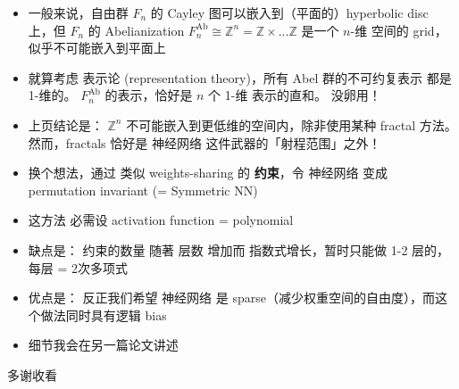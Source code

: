 \documentclass[15pt]{beamer}
\newcommand{\red}[1]{{\color{red}#1}}
\begin{document}
\begin{frame}
\begin{itemize}
\begin{equation}
		\end{equation}
	\item 一般来说，自由群 $F_n$ 的 Cayley 图可以嵌入到（平面的）hyperbolic disc 上，但 $F_n$ 的 Abelianization $F_n^{\text{Ab}} \cong \mathbb{Z}^n = \mathbb{Z} \times ... \mathbb{Z}$ 是一个 \red{$n$-维} 空间的 grid，似乎不可能嵌入到平面上
	\item 就算考虑 表示论 (representation theory)，所有 Abel 群的不可约复表示 都是 1-维的。 $F_n^{\text{Ab}}$ 的表示，恰好是 $n$ 个 1-维 表示的直和。 没卵用！
\end{itemize}
\end{frame}

\begin{frame}[plain]
\begin{itemize}
	\item 上页结论是： $\mathbb{Z}^n$ 不可能嵌入到更低维的空间内，除非使用某种 \red{fractal} 方法。  然而，fractals 恰好是 神经网络 这件武器的「射程范围」之外！ 
	\item 换个想法，通过 类似 weights-sharing 的 \textbf{约束}，令 神经网络 变成 permutation invariant (= \red{Symmetric NN})
	\item 这方法 必需设 activation function = polynomial
	\item 缺点是： 约束的数量 随著 层数 增加而 指数式增长，暂时只能做 1-2 层的，每层 = 2次多项式
	\item 优点是： 反正我们希望 神经网络 是 sparse（减少权重空间的自由度），而这个做法同时具有逻辑 bias
	\item 细节我会在另一篇论文讲述
\end{itemize}
\printbibliography
\begin{center}
	多谢收看 \smiley{}
\end{center}
\end{frame}

\end{document}
